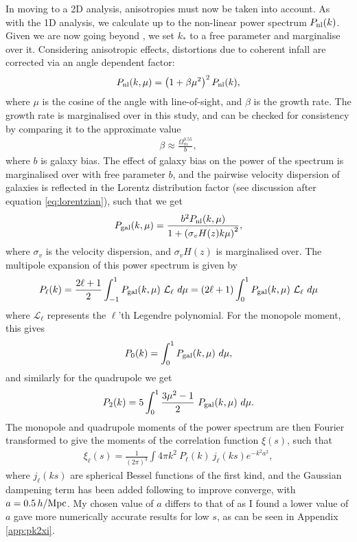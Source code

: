 \documentclass[titlesmallcaps, examinerscopy, copyrightpage]{uqthesis}
\begin{document}
In moving to a 2D analysis, anisotropies must now be taken into account. As with the 1D analysis, we calculate up to the non-linear power spectrum $P_{\rm{nl}}(k)$. Given we are now going beyond \citet{BlakeDavis2011}, we set $k_*$ to a free parameter and marginalise over it. Considering anisotropic effects, distortions due to coherent infall are corrected via an angle dependent factor:
\begin{align}
P_{\rm{nl}}(k, \mu) = \left(1 + \beta \mu^2\right)^2 P_{\text{nl}}(k),
\end{align}
where $\mu$ is the cosine of the angle with line-of-sight, and $\beta$ is the growth rate. The growth rate is marginalised over in this study, and can be checked for consistency by comparing it to the approximate value
\begin{align}
\beta \approx \frac{\Omega_m^{0.55}}{b},
\end{align}
where $b$ is galaxy bias. The effect of galaxy bias on the power of the spectrum is marginalised over with free parameter $b$, and the pairwise velocity dispersion of galaxies is reflected in the Lorentz distribution factor (see discussion after equation \ref{eq:lorentzian}), such that we get
\begin{align}
P_{\rm{gal}}(k, \mu) = \frac{b^2 P_{\rm{nl}}(k, \mu)}{1 + \left(\sigma_v H(z) k \mu\right)^2},
\end{align} 
where $\sigma_v$ is the velocity dispersion, and $\sigma_v H(z)$ is marginalised over. The multipole expansion of this power spectrum is given by
\begin{align}
P_{\ell}(k) = \frac{2\ell + 1}{2} \int_{-1}^1 P_{\rm{gal}}(k, \mu) \ \mathcal{L}_\ell \  d\mu = (2\ell + 1) \int_{0}^1 P_{\rm{gal}}(k, \mu) \ \mathcal{L}_\ell \  d\mu
\end{align}
where $\mathcal{L}_\ell$ represents the $\ell$'th Legendre polynomial. For the monopole moment, this gives
\begin{align}
P_0(k) = \int_0^1 P_{\rm{gal}}(k, \mu) \  d\mu,
\end{align}
 and similarly for the quadrupole we get
\begin{align}
P_2(k) = 5 \int_0^1 \frac{3\mu^2 - 1}{2}\  P_{\rm{gal}}(k, \mu)\  d\mu.
\end{align}
The monopole and quadrupole moments of the power spectrum are then Fourier transformed to give the moments of the correlation function $\xi(s)$, such that
\begin{align}
\xi_\ell(s) = \frac{1}{(2\pi)^3} \int 4\pi k^2 \ P_\ell(k) \ j_\ell(ks) e^{-k^2 a^2},
\end{align}
where $j_\ell(ks)$ are spherical Bessel functions of the first kind, and the Gaussian dampening term has been added following \citet{AndersonAubourg2012} to improve converge, with $a= 0.5\, h/\rm{Mpc}$. My chosen value of $a$ differs to that of \citet{AndersonAubourg2012} as I found a lower value of $a$ gave more numerically accurate results for low $s$, as can be seen in Appendix \ref{app:pk2xi}.
\end{document}
